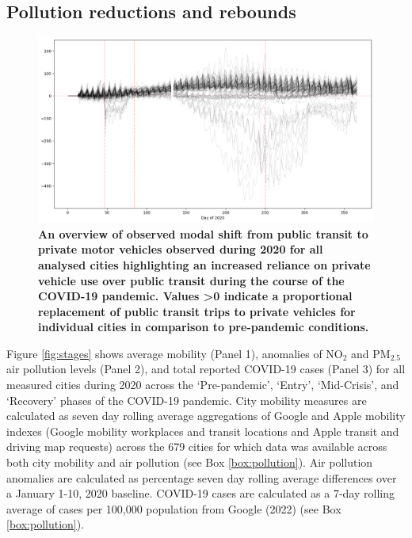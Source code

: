 \documentclass[preprint,10pt]{elsarticle} %
\begin{document}
\subsection*{Pollution reductions and rebounds}

\begin{figure}
\centering
\includegraphics[trim={0 0 0 0},clip,scale=0.4]{Images/DrivingvsTransit.png}
\caption{\bf An overview of observed modal shift from public transit to private motor vehicles observed during 2020 for all analysed cities highlighting an increased reliance on private vehicle use over public transit during the course of the COVID-19 pandemic. Values \textgreater 0 indicate a proportional replacement of public transit trips to private vehicles for individual cities in comparison to pre-pandemic conditions.}  
 \label{fig:driv_trans}
\end{figure}


Figure \ref{fig:stages} shows average mobility (Panel 1), anomalies of NO$_{2}$ and PM$_{2.5}$ air pollution levels (Panel 2), and total reported COVID-19 cases (Panel 3) for all measured cities during 2020 across the `Pre-pandemic', `Entry', `Mid-Crisis', and `Recovery' phases of the COVID-19 pandemic. City mobility measures are calculated as seven day rolling average aggregations of Google and Apple mobility indexes (Google mobility workplaces and transit locations and Apple transit and driving map requests) across the 679 cities for which data was available across both city mobility and air pollution (see Box \ref{box:pollution}). Air pollution anomalies are calculated as percentage seven day rolling average differences over a January 1-10, 2020 baseline. COVID-19 cases are calculated as a 7-day rolling average of cases per 100,000 population from Google (2022)\cite{Google2022} (see Box \ref{box:pollution}).
\end{document}
